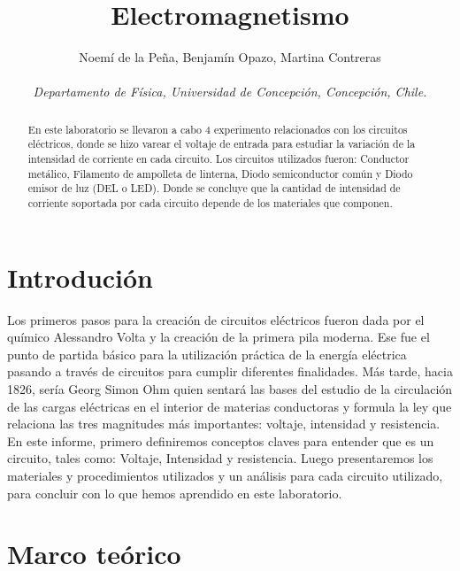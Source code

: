 \documentclass[]{article}
\title{Electromagnetismo}
\author{Noemí de la Peña, Benjamín Opazo, Martina Contreras \\ \\
\textit{ Departamento de Física, Universidad de Concepción, Concepción, Chile. }}
\date{}
\begin{document}
\maketitle 

\begin{abstract}
  En este laboratorio se llevaron a cabo 4 experimento relacionados con los circuitos eléctricos, donde se hizo varear el voltaje de entrada para estudiar la variación de la intensidad de corriente en cada circuito.
Los circuitos utilizados fueron: Conductor metálico, Filamento de ampolleta de linterna, Diodo semiconductor común y Diodo emisor de luz (DEL o LED).
Donde se concluye que la cantidad de intensidad de corriente soportada por cada circuito depende de los materiales que componen.
\end{abstract}



\section*{Introdución}
Los primeros pasos para la creación de circuitos eléctricos fueron dada por el químico Alessandro Volta y la creación de la primera pila moderna. Ese fue el punto de partida básico para la   utilización práctica de la energía eléctrica pasando a través de circuitos para cumplir diferentes finalidades.
Más tarde, hacia 1826, sería Georg Simon Ohm quien sentará las bases del estudio de la circulación de las cargas eléctricas en el interior de materias conductoras y formula la ley que relaciona las tres magnitudes más importantes: voltaje, intensidad y resistencia.
En este informe, primero definiremos conceptos claves para entender que es un circuito, tales como: Voltaje, Intensidad y resistencia. Luego presentaremos los materiales y procedimientos utilizados y un análisis para cada circuito utilizado, para concluir con lo que hemos aprendido en este laboratorio.


\section*{Marco teórico}
\end{document}
